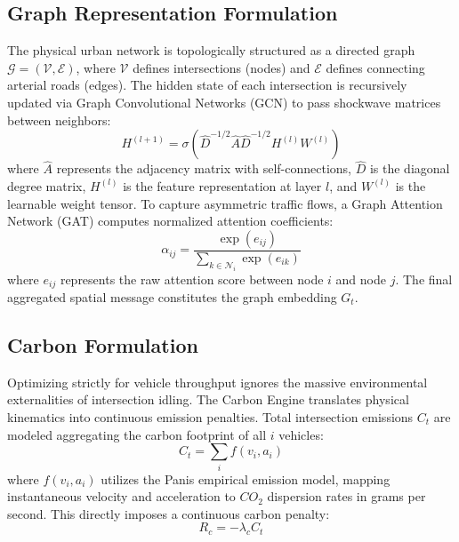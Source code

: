 \subsection{Graph Representation Formulation}
The physical urban network is topologically structured as a directed graph $\mathcal{G} = (\mathcal{V}, \mathcal{E})$, where $\mathcal{V}$ defines intersections (nodes) and $\mathcal{E}$ defines connecting arterial roads (edges). The hidden state of each intersection is recursively updated via Graph Convolutional Networks (GCN) to pass shockwave matrices between neighbors:
\begin{equation}
H^{(l+1)} = \sigma\left( \hat{D}^{-1/2}\hat{A}\hat{D}^{-1/2}H^{(l)}W^{(l)} \right)
\end{equation}
where $\hat{A}$ represents the adjacency matrix with self-connections, $\hat{D}$ is the diagonal degree matrix, $H^{(l)}$ is the feature representation at layer $l$, and $W^{(l)}$ is the learnable weight tensor. To capture asymmetric traffic flows, a Graph Attention Network (GAT) computes normalized attention coefficients:
\begin{equation}
\alpha_{ij} = \frac{\exp(e_{ij})}{\sum_{k \in \mathcal{N}_i} \exp(e_{ik})}
\end{equation}
where $e_{ij}$ represents the raw attention score between node $i$ and node $j$. The final aggregated spatial message constitutes the graph embedding $G_t$.

\subsection{Carbon Formulation}
Optimizing strictly for vehicle throughput ignores the massive environmental externalities of intersection idling. The Carbon Engine translates physical kinematics into continuous emission penalties. Total intersection emissions $C_t$ are modeled aggregating the carbon footprint of all $i$ vehicles:
\begin{equation}
C_t = \sum_i f(v_i, a_i)
\end{equation}
where $f(v_i, a_i)$ utilizes the Panis empirical emission model, mapping instantaneous velocity and acceleration to $CO_2$ dispersion rates in grams per second. This directly imposes a continuous carbon penalty:
\begin{equation}
R_c = -\lambda_c C_t
\end{equation}

